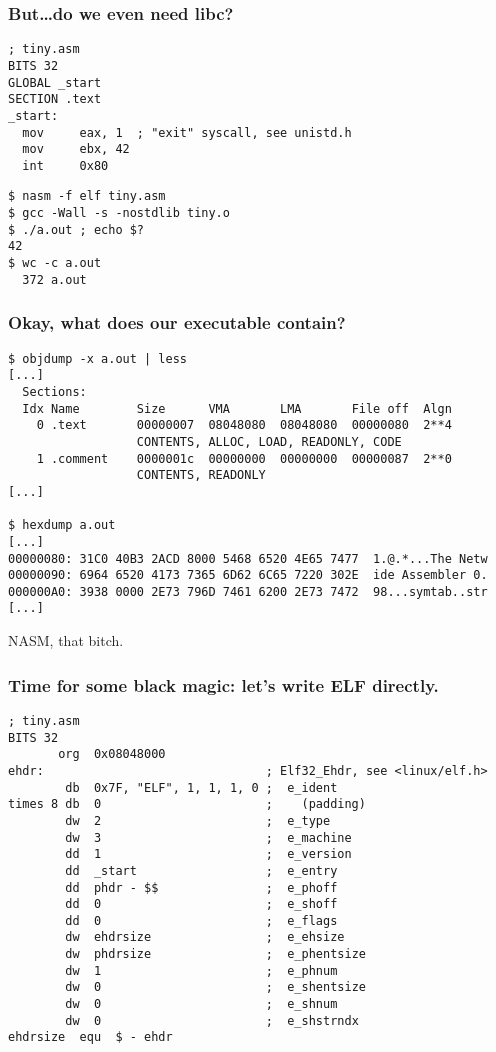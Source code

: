 \documentclass{beamer}
\begin{document}
\begin{frame}[fragile]
\frametitle{But\ldots do we even need libc?}
\begin{lstlisting}
; tiny.asm
BITS 32
GLOBAL _start
SECTION .text
_start:
  mov     eax, 1  ; "exit" syscall, see unistd.h
  mov     ebx, 42
  int     0x80
\end{lstlisting}
\pause
\begin{lstlisting}
$ nasm -f elf tiny.asm
$ gcc -Wall -s -nostdlib tiny.o
$ ./a.out ; echo $?
42
$ wc -c a.out
  372 a.out
\end{lstlisting}
\end{frame}

\begin{frame}[fragile]
\frametitle{Okay, what does our executable contain?}
\begin{lstlisting}[basicstyle=\scriptsize\ttfamily]
$ objdump -x a.out | less
[...]
  Sections:
  Idx Name        Size      VMA       LMA       File off  Algn
    0 .text       00000007  08048080  08048080  00000080  2**4
                  CONTENTS, ALLOC, LOAD, READONLY, CODE
    1 .comment    0000001c  00000000  00000000  00000087  2**0
                  CONTENTS, READONLY
[...]

$ hexdump a.out
[...]
00000080: 31C0 40B3 2ACD 8000 5468 6520 4E65 7477  1.@.*...The Netw
00000090: 6964 6520 4173 7365 6D62 6C65 7220 302E  ide Assembler 0.
000000A0: 3938 0000 2E73 796D 7461 6200 2E73 7472  98...symtab..str
[...]
\end{lstlisting}
NASM, that bitch.
\end{frame}

\begin{frame}[fragile]
\frametitle{Time for some black magic: let's write ELF directly.}
\begin{lstlisting}[basicstyle=\scriptsize\ttfamily]
; tiny.asm
BITS 32
       org  0x08048000
ehdr:                               ; Elf32_Ehdr, see <linux/elf.h>
        db  0x7F, "ELF", 1, 1, 1, 0 ;  e_ident
times 8 db  0                       ;    (padding)
        dw  2                       ;  e_type
        dw  3                       ;  e_machine
        dd  1                       ;  e_version
        dd  _start                  ;  e_entry
        dd  phdr - $$               ;  e_phoff
        dd  0                       ;  e_shoff
        dd  0                       ;  e_flags
        dw  ehdrsize                ;  e_ehsize
        dw  phdrsize                ;  e_phentsize
        dw  1                       ;  e_phnum
        dw  0                       ;  e_shentsize
        dw  0                       ;  e_shnum
        dw  0                       ;  e_shstrndx
ehdrsize  equ  $ - ehdr
\end{lstlisting}
\end{frame}
\end{document}
